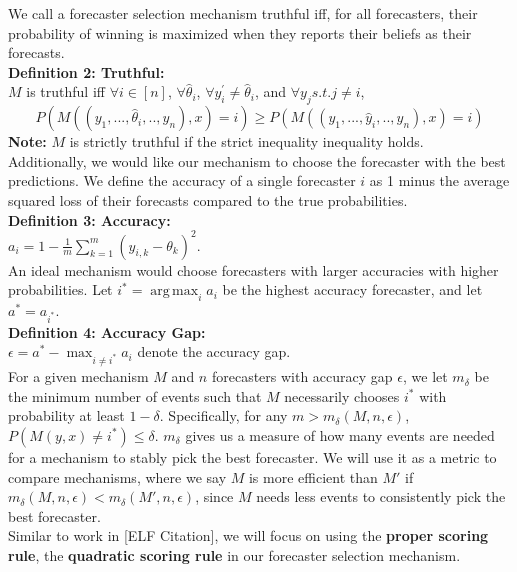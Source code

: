 \documentclass[letterpaper,12pt]{article}
\DeclareMathOperator*{\argmax}{arg\,max}
\newcommand{\1}{\mathbbm{1}}
\begin{document}
We call a forecaster selection mechanism truthful iff, for all forecasters, their probability of winning is maximized when they reports their beliefs as their forecasts.\\

\textbf{Definition 2: Truthful:}\\
$M$ is truthful iff $\forall i \in [n]$, $\forall \hat{\theta}_i$, $\forall y^{\prime}_i \neq \hat{\theta}_i$, and $\forall y_j s.t. j \neq i$,
\[ P(M( (y_1, ..., \hat \theta_i, .., y_n), x ) = i) \geq  P(M( (y_1, ..., \hat y_i, .., y_n), x ) = i)\]
\textbf{Note:} $M$ is strictly truthful if the strict inequality inequality holds.\\

Additionally, we would like our mechanism to choose the forecaster with the best predictions. We define the accuracy of a single forecaster $i$ as 1 minus the average squared loss of their forecasts compared to the true probabilities.\\

\textbf{Definition 3: Accuracy:}\\
$a_i = 1 - \frac{1}{m}\sum_{k=1}^m (y_{i, k} - \theta_k)^2$.\\

An ideal mechanism would choose forecasters with larger accuracies with higher probabilities. Let $i^* = \argmax_i a_i$ be the highest accuracy forecaster, and let $a^* = a_{i^*}$.\\

\textbf{Definition 4: Accuracy Gap:}\\
$\epsilon = a^* - \max_{i \neq i^*} a_i$ denote the accuracy gap.\\

For a given mechanism $M$ and $n$ forecasters with accuracy gap $\epsilon$, we let $m_\delta$ be the minimum number of events such that $M$ necessarily chooses $i^*$ with probability at least $1 - \delta$. Specifically, for any $m > m_\delta(M, n, \epsilon)$, $P(M(y, x) \neq i^*) \leq \delta$. $m_\delta$ gives us a measure of how many events are needed for a mechanism to stably pick the best forecaster. We will use it as a metric to compare mechanisms, where we say $M$ is more efficient than $M'$ if $m_\delta(M, n, \epsilon) < m_\delta(M', n, \epsilon)$, since $M$ needs less events to consistently pick the best forecaster.\\

Similar to work in [ELF Citation], we will focus on using the \textbf{proper scoring rule}, the \textbf{quadratic scoring rule} in our forecaster selection mechanism.\\
\end{document}
